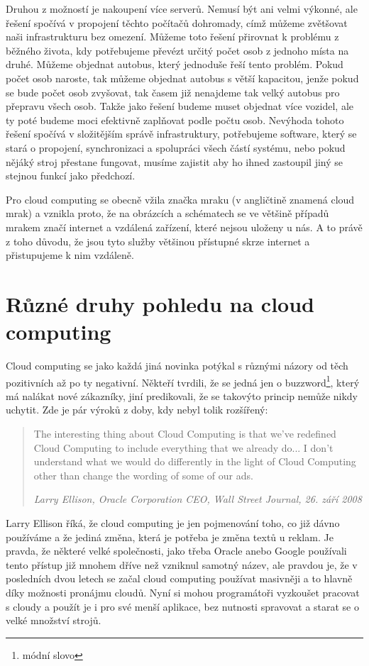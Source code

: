Druhou z možností je nakoupení více serverů. Nemusí být ani velmi výkonné, ale řešení spočívá v propojení těchto počítačů dohromady, címž můžeme zvětšovat naši infrastrukturu bez omezení. Můžeme toto řešení přirovnat k problému z běžného života, kdy potřebujeme převézt určitý počet osob z jednoho místa na druhé. Můžeme objednat autobus, který jednoduše řeší tento problém. Pokud počet osob naroste, tak můžeme objednat autobus s větší kapacitou, jenže pokud se bude počet osob zvyšovat, tak časem již nenajdeme tak velký autobus pro přepravu všech osob. Takže jako řešení budeme muset objednat více vozidel, ale ty poté budeme moci efektivně zaplňovat podle počtu osob. Nevýhoda tohoto řešení spočívá v složitějším správě infrastruktury, potřebujeme software, který se stará o propojení, synchronizaci a spolupráci všech částí systému, nebo pokud nějáký stroj přestane fungovat, musíme zajistit aby ho ihned zastoupil jiný se stejnou funkcí jako předchozí.

Pro cloud computing se obecně vžila značka mraku (v angličtině znamená cloud mrak) a vznikla proto, že na obrázcích a schématech se ve většině případů mrakem značí internet a vzdálená zařízení, které nejsou uloženy u nás. A to právě z toho důvodu, že jsou tyto služby většinou přístupné skrze internet a přistupujeme k nim vzdáleně.

\section{Různé druhy pohledu na cloud computing}
Cloud computing se jako každá jiná novinka potýkal s různými názory od těch pozitivních až po ty negativní. Někteří tvrdili, že se jedná jen o buzzword\footnote{módní slovo}, který má nalákat nové zákazníky, jiní predikovali, že se takovýto princip nemůže nikdy uchytit. Zde je pár výroků  z doby, kdy nebyl tolik rozšířený:

\begin{quotation}
The interesting thing about Cloud Computing is that we’ve redefined Cloud Computing to include everything that we already do...  I don’t understand what we would do differently in the light of Cloud Computing other than change the wording of some of our ads.

\em Larry Ellison, Oracle Corporation CEO, Wall Street Journal, 26. září 2008
\end{quotation}

Larry Ellison říká, že cloud computing je jen pojmenování toho, co již dávno používáme a že jediná změna, která je potřeba je změna textů u reklam. Je pravda, že některé velké společnosti, jako třeba Oracle anebo Google používali tento přístup již mnohem dříve než vzniknul samotný název, ale pravdou je, že v posledních dvou letech se začal cloud computing používat masivněji a to hlavně díky možnosti pronájmu cloudů. Nyní si mohou programátoři vyzkoušet pracovat s cloudy a použít je i pro své menší aplikace, bez nutnosti spravovat a starat se o velké množství strojů.

